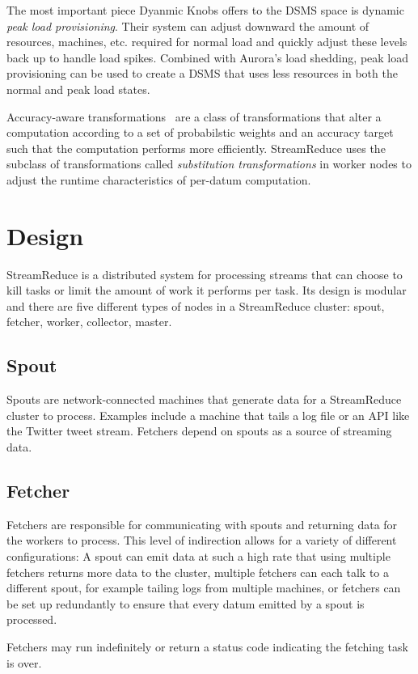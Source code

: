 \documentclass[12pt,twocolumn]{article}
\begin{document}
The most important piece Dyanmic Knobs offers to the DSMS space is dynamic
\emph{peak load provisioning}. Their system can adjust downward the amount of resources,
machines, etc. required for normal load and quickly adjust these levels back up to
handle load spikes. Combined with Aurora's load shedding, peak load provisioning can
be used to create a DSMS that uses less resources in both the normal and peak load
states.

Accuracy-aware transformations~\cite{Zhu:2012:RAP:2103656.2103710} are a class of transformations
that alter a computation according to a set of probabilstic weights and an accuracy
target such that the computation performs more efficiently. StreamReduce uses the subclass
of transformations called \emph{substitution transformations} in worker nodes to adjust
the runtime characteristics of per-datum computation.

\section{Design}
\label{sec:design}
StreamReduce is a distributed system for processing streams that can choose to kill tasks or
limit the amount of work it performs per task. Its design is modular and there are five
different types of nodes in a StreamReduce cluster: spout, fetcher, worker, collector, master.
\subsection{Spout}
Spouts are network-connected machines that generate data for a StreamReduce cluster to process.
Examples include a machine that tails a log file or an API like the Twitter tweet
stream. Fetchers depend on spouts as a source of streaming data.
\subsection{Fetcher}
Fetchers are responsible for communicating with spouts and returning data for the
workers to process. This level of indirection allows for a variety of different
configurations: A spout can emit data at such a high rate that using multiple fetchers
returns more data to the cluster, multiple fetchers can each talk to a different spout,
for example tailing logs from multiple machines, or fetchers can be set up redundantly
to ensure that every datum emitted by a spout is processed.

Fetchers may run indefinitely or return a status code indicating
the fetching task is over.
\end{document}
